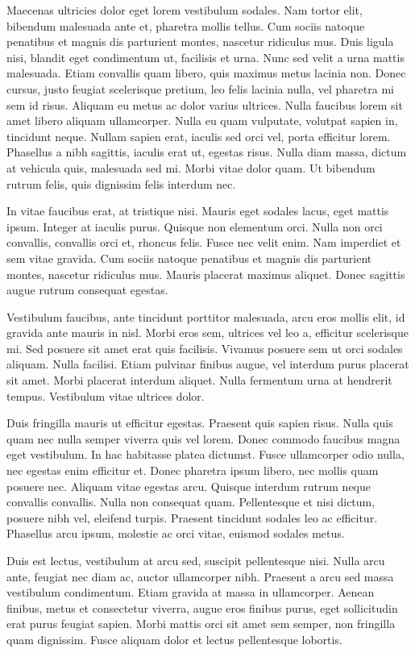 Maecenas ultricies dolor eget lorem vestibulum sodales. Nam tortor elit, bibendum malesuada ante et, pharetra mollis tellus. Cum sociis natoque penatibus et magnis dis parturient montes, nascetur ridiculus mus. Duis ligula nisi, blandit eget condimentum ut, facilisis et urna. Nunc sed velit a urna mattis malesuada. Etiam convallis quam libero, quis maximus metus lacinia non. Donec cursus, justo feugiat scelerisque pretium, leo felis lacinia nulla, vel pharetra mi sem id risus. Aliquam eu metus ac dolor varius ultrices. Nulla faucibus lorem sit amet libero aliquam ullamcorper. Nulla eu quam vulputate, volutpat sapien in, tincidunt neque. Nullam sapien erat, iaculis sed orci vel, porta efficitur lorem. Phasellus a nibh sagittis, iaculis erat ut, egestas risus. Nulla diam massa, dictum at vehicula quis, malesuada sed mi. Morbi vitae dolor quam. Ut bibendum rutrum felis, quis dignissim felis interdum nec.

In vitae faucibus erat, at tristique nisi. Mauris eget sodales lacus, eget mattis ipsum. Integer at iaculis purus. Quisque non elementum orci. Nulla non orci convallis, convallis orci et, rhoncus felis. Fusce nec velit enim. Nam imperdiet et sem vitae gravida. Cum sociis natoque penatibus et magnis dis parturient montes, nascetur ridiculus mus. Mauris placerat maximus aliquet. Donec sagittis augue rutrum consequat egestas.

Vestibulum faucibus, ante tincidunt porttitor malesuada, arcu eros mollis elit, id gravida ante mauris in nisl. Morbi eros sem, ultrices vel leo a, efficitur scelerisque mi. Sed posuere sit amet erat quis facilisis. Vivamus posuere sem ut orci sodales aliquam. Nulla facilisi. Etiam pulvinar finibus augue, vel interdum purus placerat sit amet. Morbi placerat interdum aliquet. Nulla fermentum urna at hendrerit tempus. Vestibulum vitae ultrices dolor.

Duis fringilla mauris ut efficitur egestas. Praesent quis sapien risus. Nulla quis quam nec nulla semper viverra quis vel lorem. Donec commodo faucibus magna eget vestibulum. In hac habitasse platea dictumst. Fusce ullamcorper odio nulla, nec egestas enim efficitur et. Donec pharetra ipsum libero, nec mollis quam posuere nec. Aliquam vitae egestas arcu. Quisque interdum rutrum neque convallis convallis. Nulla non consequat quam. Pellentesque et nisi dictum, posuere nibh vel, eleifend turpis. Praesent tincidunt sodales leo ac efficitur. Phasellus arcu ipsum, molestie ac orci vitae, euismod sodales metus.

Duis est lectus, vestibulum at arcu sed, suscipit pellentesque nisi. Nulla arcu ante, feugiat nec diam ac, auctor ullamcorper nibh. Praesent a arcu sed massa vestibulum condimentum. Etiam gravida at massa in ullamcorper. Aenean finibus, metus et consectetur viverra, augue eros finibus purus, eget sollicitudin erat purus feugiat sapien. Morbi mattis orci sit amet sem semper, non fringilla quam dignissim. Fusce aliquam dolor et lectus pellentesque lobortis. 

